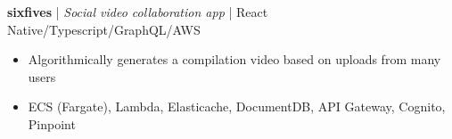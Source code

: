 \textbf{sixfives} | \textit{Social video collaboration app} | {React Native/Typescript/GraphQL/AWS}
\begin{itemize}
    \item Algorithmically generates a compilation video based on uploads from many users
    \item ECS (Fargate), Lambda, Elasticache, DocumentDB, API Gateway, Cognito, Pinpoint
\end{itemize}
